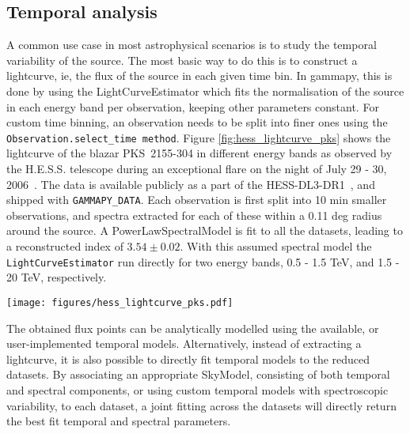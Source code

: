 \subsection{Temporal analysis}
\label{ssec:temporal-analysis}

A common use case in most astrophysical scenarios is to study the temporal
variability of the source. The most basic way to do this is to construct a
lightcurve, ie, the flux of the source in each given time bin. In gammapy, this
is done by using the LightCurveEstimator which fits the normalisation of the
source in each energy band per observation, keeping other parameters constant.
For custom time binning, an observation needs to be split into finer ones using
the \verb"Observation.select_time method". Figure \ref{fig:hess_lightcurve_pks}
shows the lightcurve of the blazar PKS~2155-304 in different energy bands as
observed by the H.E.S.S. telescope during an exceptional flare on the night of
July 29 - 30, 2006~\cite{2009A&A...502..749A}. The data is available publicly
as a part of the HESS-DL3-DR1~\cite{HESS-DL3-DR1}, and shipped with
\verb"GAMMAPY_DATA". Each observation is first split into 10 min smaller
observations, and spectra extracted for each of these within a 0.11 deg radius
around the source. A PowerLawSpectralModel is fit to all the datasets, leading
to a reconstructed index of $3.54 \pm 0.02$. With this assumed spectral model
the \verb"LightCurveEstimator" run directly for two energy bands, 0.5 - 1.5
TeV, and 1.5 - 20 TeV,	respectively.

\begin{figure*}[t]
	\centering
	\texttt{[image: figures/hess\_lightcurve\_pks.pdf]}
	\caption{10 min binned lightcurve for PKS~2155-304 in two energy bands, (500
		GeV - 1.5 TeV, and 1.5 TeV to 20 TeV) as observed by the H.E.S.S. telescopes in
		2006.} \label{fig:hess_lightcurve_pks} \end{figure*}

The obtained flux points can be analytically modelled using the available, or
user-implemented temporal models. Alternatively, instead of  extracting a
lightcurve, it is also possible to directly fit temporal models to the reduced
datasets. By associating an appropriate SkyModel, consisting of both temporal
and spectral components, or using custom temporal models with spectroscopic
variability, to each dataset, a joint fitting across the datasets will directly
return the best fit temporal and spectral parameters.
